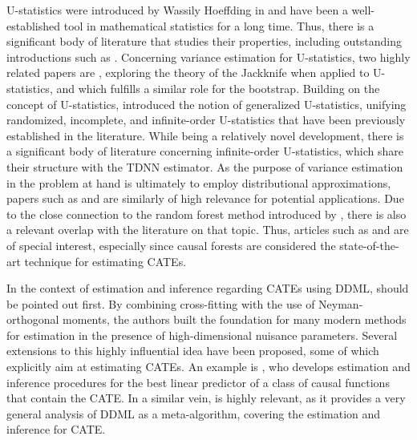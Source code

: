 U-statistics were introduced by Wassily Hoeffding in
\citet{hoeffding_class_1948} and have been a well-established tool in
mathematical statistics for a long time. Thus, there is a significant body of
literature that studies their properties, including outstanding introductions such
as \citet{lee_u-statistics_2019}. Concerning variance estimation for
U-statistics, two highly related papers are \citet{arvesen_jackknifing_1969},
exploring the theory of the Jackknife when applied to U-statistics, and
\citet{arcones_bootstrap_1992} which fulfills a similar role for the bootstrap.
Building on the concept of U-statistics, \citet{peng_rates_2022} introduced the
notion of generalized U-statistics, unifying randomized, incomplete, and
infinite-order U-statistics that have been previously established in the
literature. While being a relatively novel development, there is a significant
body of literature concerning infinite-order U-statistics, which share their
structure with the TDNN estimator. As the purpose of variance estimation in the
problem at hand is ultimately to employ distributional approximations, papers
such as \citet{chen_randomized_2019} and \citet{song_approximating_2019} are
similarly of high relevance for potential applications. Due to the close
connection to the random forest method introduced by
\citet{breiman_random_2001}, there is also a relevant overlap with the
literature on that topic. Thus, articles such as \citet{wager_confidence_2014} and
\citet{wager_estimation_2018} are of special interest, especially since causal forests are considered the state-of-the-art technique for estimating CATEs.

In the context of estimation and inference regarding CATEs using DDML, \citet{chernozhukov_doubledebiased_2018} should be pointed out first.
By combining cross-fitting with the use of Neyman-orthogonal moments, the authors built the foundation for many modern methods for estimation in the presence of high-dimensional nuisance parameters.
Several extensions to this highly influential idea have been proposed, some of which explicitly aim at estimating CATEs.
An example is \citet{semenova_debiased_2021}, who develops estimation and inference procedures for the best linear predictor of a class of causal functions that contain the CATE.
In a similar vein, \citet{chernozhukov_simple_2022} is highly relevant, as it provides a very general analysis of DDML as a meta-algorithm, covering the estimation and inference for CATE.
